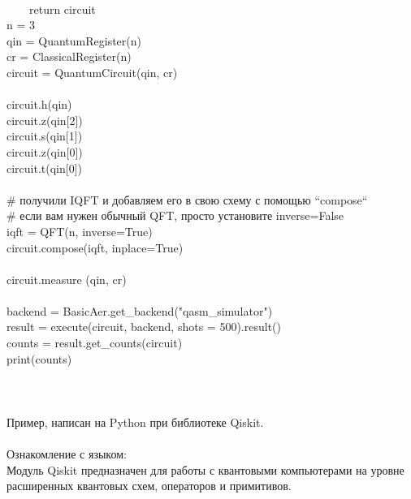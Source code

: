 \documentclass[12pt,a4paper]{article}
\begin{document}
{			\hspace{1em}\\
			~~~~return circuit\\
			n = 3\\
			qin = QuantumRegister(n)\\
			cr = ClassicalRegister(n)\\
			circuit = QuantumCircuit(qin, cr)\\
			\hspace{1em}\\
			circuit.h(qin)\\
			circuit.z(qin[2])\\
			circuit.s(qin[1])\\
			circuit.z(qin[0])\\
			circuit.t(qin[0])\\
			\hspace{1em}\\
			\# получили IQFT и добавляем его в свою схему с помощью ``compose``\\
			\# если вам нужен обычный QFT, просто установите inverse=False\\
			iqft = QFT(n, inverse=True)\\
			circuit.compose(iqft, inplace=True)\\
			\hspace{1em}\\
			circuit.measure (qin, cr)\\
			\hspace{1em}\\
			backend = BasicAer.get\_backend("qasm\_simulator")\\
			result = execute(circuit, backend, shots = 500).result()\\
			counts = result.get\_counts(circuit)\\
			print(counts)\\}
		\hspace{1em}\\
		\hspace{1em}\\
		\hspace{1em}\\
		Пример, написан на Python при библиотеке Qiskit.\\
		\hspace{1em}\\
		Ознакомление с языком:\\
		Модуль Qiskit предназначен для работы с квантовыми компьютерами на уровне расширенных квантовых схем, операторов и примитивов.\\
\end{document}
